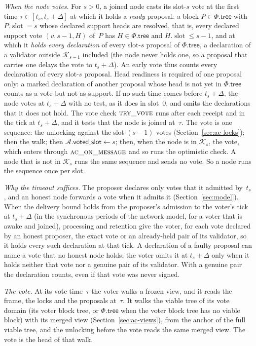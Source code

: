 \documentclass{article}
\newcommand{\slot}{\operatorname{slot}}
\newcommand{\committee}{\mathcal K}
\newcommand{\AC}{\mathcal A}
\newcommand{\Fr}{\Phi}
\newcommand{\tree}{\mathsf{tree}}
\newcommand{\votedSlot}{\mathsf{voted\_slot}}
\begin{document}
\emph{When the node votes.}  For $s>0$, a joined node casts its slot-$s$
vote at the first time $\tau\in[t_s,t_s+\Delta]$ at which it holds a \emph{ready} proposal: a block $P\in\Fr.\tree$
with $P.\slot=s$ whose declared support heads are resolved, that is, every
declared support vote $(v,s-1,H)$ of~$P$ has $H\in\Fr.\tree$ and
$H.\slot\leq s-1$, and at which it \emph{holds every declaration} of
every slot-$s$ proposal of $\Fr.\tree$, a declaration of a validator outside
$\committee_{s-1}$ included (the node never holds one, so a proposal that
carries one delays the vote to $t_s+\Delta$).  An early vote thus counts every
declaration of every slot-$s$ proposal.  Head readiness is required of one
proposal only: a marked declaration of another proposal whose head is not
yet in $\Fr.\tree$ counts as a vote but not as support.  If no such time
comes before $t_s+\Delta$, the node votes at $t_s+\Delta$ with no test, as
it does in slot~$0$, and omits the declarations that it does not hold.
The vote check $\Call{try\_vote}{}$ runs after each receipt and
in the tick at $t_s+\Delta$, and it tests that the node is joined at~$\tau$.
The vote is one sequence: the unlocking against the slot-$(s-1)$ votes
(Section~\ref{sec:ac-locks}); then the walk; then $\AC.\votedSlot\gets s$;
then, when the node is in $\committee_s$, the vote, which enters through
$\Call{ac\_on\_message}{}$ and so runs the optimistic check.  A node that
is not in $\committee_s$ runs the same sequence and sends no vote.  So a
node runs the sequence once per slot.

\emph{Why the timeout suffices.}  The proposer declares only votes that it
admitted by~$t_s$, and an honest node forwards a vote when it admits it
(Section~\ref{sec:model}).  When the delivery bound holds from the
proposer's admission to the voter's tick at $t_s+\Delta$ (in the
synchronous periods of the network model, for a voter that is awake and
joined), processing and retention give the voter, for each vote declared
by an honest proposer, the exact vote or an already-held pair of its
validator, so it holds every such declaration at that tick.  A
declaration of a faulty proposal can name a vote that no honest node
holds; the voter omits it at $t_s+\Delta$ only when it holds neither that
vote nor a genuine pair of its validator.  With a genuine pair the
declaration counts, even if that vote was never signed.

\emph{The vote.}  At its vote time~$\tau$ the voter walks a frozen view,
and it reads the frame, the locks and the proposals at~$\tau$.  It walks
the viable tree of its vote domain (its voter block tree, or $\Fr.\tree$
when the voter block tree has no viable block) with its merged view
(Section~\ref{sec:ac-views}), from the anchor of the full viable tree, and
the unlocking before the vote reads the same merged view.  The vote is the
head of that walk.
\end{document}
